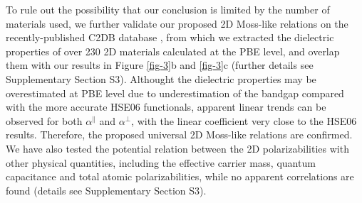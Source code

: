 \documentclass[journal=ancac3,manuscript=article,email=true,hyperref=true,keywords=false]{achemso}
\begin{document}
To rule out the possibility that our conclusion is limited by the
number of materials used, we further validate our proposed 2D
Moss-like relations on the recently-published C2DB database
\cite{Haastrup_2018}, from which we extracted the dielectric
properties of over 230 2D materials calculated at the PBE level, and
overlap them with our results in Figure \ref{fig-3}b and \ref{fig-3}c
(further details see Supplementary Section S3). Althought the
dielectric properties may be overestimated at PBE level due to
underestimation of the bandgap compared with the more accurate HSE06
functionals, apparent linear trends can be observed for both
$\alpha^{\parallel}$ and $\alpha^{\perp}$, with the linear coefficient
very close to the HSE06 results. Therefore, the proposed universal 2D
Moss-like relations are confirmed.  We have also tested the potential
relation between the 2D polarizabilities with other physical
quantities, including the effective carrier mass, quantum capacitance
and total atomic polarizabilities, while no apparent correlations are
found (details see Supplementary Section S3). 
\end{document}
